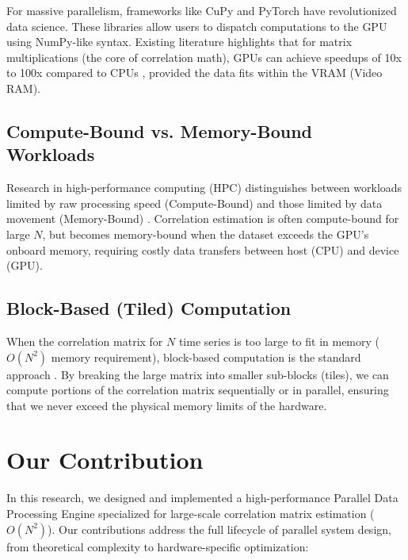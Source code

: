 For massive parallelism, frameworks like CuPy \cite{okuta2017cupy} and PyTorch \cite{paszke2019pytorch} have revolutionized data science. These libraries allow users to dispatch computations to the GPU using NumPy-like syntax. Existing literature highlights that for matrix multiplications (the core of correlation math), GPUs can achieve speedups of 10x to 100x compared to CPUs \cite{kirk2016programming}, provided the data fits within the VRAM (Video RAM).

\subsection{Compute-Bound vs. Memory-Bound Workloads}

Research in high-performance computing (HPC) distinguishes between workloads limited by raw processing speed (Compute-Bound) and those limited by data movement (Memory-Bound) \cite{kirk2016programming}. Correlation estimation is often compute-bound for large $N$, but becomes memory-bound when the dataset exceeds the GPU's onboard memory, requiring costly data transfers between host (CPU) and device (GPU).

\subsection{Block-Based (Tiled) Computation}

When the correlation matrix for $N$ time series is too large to fit in memory ($O(N^2)$ memory requirement), block-based computation is the standard approach \cite{anderson1999lapack}. By breaking the large matrix into smaller sub-blocks (tiles), we can compute portions of the correlation matrix sequentially or in parallel, ensuring that we never exceed the physical memory limits of the hardware.

\section{Our Contribution}
In this research, we designed and implemented a high-performance Parallel Data Processing Engine specialized for large-scale correlation matrix estimation ($O(N^2)$). Our contributions address the full lifecycle of parallel system design, from theoretical complexity to hardware-specific optimization:

